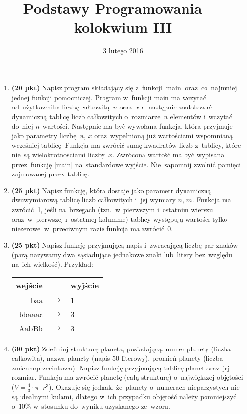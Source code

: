 \documentclass[extrafontsizes,12pt]{article}
\title{Podstawy Programowania --- kolokwium III}
\date{3 lutego 2016}
\begin{document}
\maketitle
\DefineShortVerb{\|}
\thispagestyle{empty}

\begin{enumerate}
\itemsep4pt

\item \textbf{(20 pkt)}
Napisz program składający się z~funkcji |main|
oraz~co~najmniej jednej funkcji pomocniczej.
Program w~funkcji main ma wczytać od~użytkownika liczbę całkowitą~$n$ oraz~$x$
a~następnie zaalokować dynamiczną tablicę liczb całkowitych
o~rozmiarze~$n$ elementów i~wczytać do~niej $n$~wartości.
Następnie ma być wywołana funkcja,
która przyjmuje jako parametry liczbę~$n$, $x$
oraz~wypełnioną już wartościami wspomnianą wcześniej tablicę.
Funkcja ma zwrócić sumę kwadratów liczb z~tablicy,
które nie~są wielokrotnościami liczby~$x$.
Zwrócona wartość ma być wypisana przez~funkcję |main| na~standardowe wyjście.
Nie~zapomnij zwolnić pamięci zajmowanej przez~tablicę.

\item \textbf{(25 pkt)}
Napisz funkcję, która dostaje jako parametr dynamiczną
dwuwymiarową tablicę liczb całkowitych i~jej wymiary $n$, $m$.
Funkcja ma zwrócić~1, jeśli na~brzegach
(tzn.~w~pierwszym i~ostatnim wierszu oraz~w~pierwszej
i~ostatniej kolumnie) tablicy występują wartości tylko niezerowe;
w~przeciwnym razie funkcja ma zwrócić~0. 

\item \textbf{(25 pkt)}
Napisz funkcję przyjmującą napis i~zwracającą liczbę par znaków
(parą nazywamy dwa sąsiadujące jednakowe znaki lub~litery
bez~względu na~ich wielkość).
Przykład:
\begin{center}
\begin{tabular}{ r c l }
wejście & & wyjście \\
\hline
baa & $\rightarrow$ & 1 \\
bbaaac & $\rightarrow$ & 3 \\
AabBb & $\rightarrow$ & 3 \\
\end{tabular}
\end{center}

\item \textbf{(30 pkt)}
Zdefiniuj strukturę planeta, posiadającą:
numer planety (liczba całkowita),
nazwa planety (napis 50-literowy),
promień planety (liczba zmiennoprzecinkowa).
Napisz funkcję przyjmującą tablicę planet
oraz~jej rozmiar.
Funkcja ma zwrócić planetę (całą strukturę)
o~największej objętości ($V = \frac{4}{3} \cdot \pi \cdot r^3$).
Okazuje się jednak, że~planety o~numerach nieparzystych
nie są idealnymi kulami, dlatego w~ich przypadku
objętość należy pomniejszyć o~10\%
w~stosunku do~wyniku uzyskanego ze~wzoru.

\end{enumerate}
\end{document}

